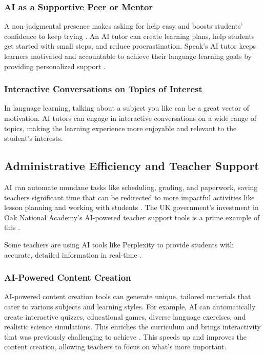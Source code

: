 \documentclass{article}
\begin{document}
\subsubsection{AI as a Supportive Peer or Mentor}

A non-judgmental presence makes asking for help easy and
boosts students' confidence to keep trying
\cite{springer_ai_education}.
An AI tutor can create learning plans,
help students get started with small steps,
and reduce procrastination. Speak's AI tutor keeps
learners motivated and accountable to achieve their
language learning goals by providing personalized support
\cite{speak}.

\subsubsection{Interactive Conversations on Topics of Interest}

In language learning, talking about a subject you like can be
a great vector of motivation. AI tutors can engage in interactive
conversations on a wide range of topics, making the learning
experience more enjoyable and relevant to the student's interests.

\subsection{Administrative Efficiency and Teacher Support}

AI can automate mundane tasks like scheduling, grading, and
paperwork, saving teachers significant time that can be redirected
to more impactful activities like lesson planning and working with
students \cite{datasciencecentral_automated_grading} \cite{mckinsey_ai_k12_teachers}.
The UK government's investment in Oak National Academy's
AI-powered teacher support tools is a prime example
of this \cite{govuk_ai_teacher_support}
\cite{openaccessgov_ai_teacher_support}.

Some teachers are using AI tools like Perplexity to provide
 students with accurate, detailed information in real-time
  \cite{tri_cityherald_ai_cheating}.


\subsubsection{AI-Powered Content Creation}

AI-powered content creation tools can generate unique,
 tailored materials that cater to various subjects and learning styles.
  For example, AI can automatically create interactive quizzes,
  educational games, diverse language exercises, and realistic
   science simulations. This enriches the curriculum and brings
    interactivity that was previously challenging to achieve
    \cite{neurosys2023generative}. 
    This speeds up and improves the content creation,
     allowing teachers to focus on what's more important.
\end{document}

